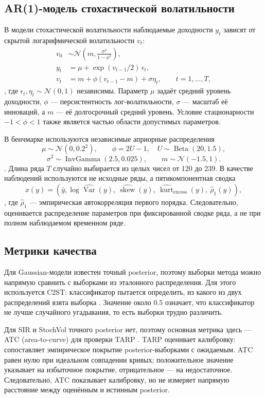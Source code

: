 \subsection{AR(1)-модель стохастической волатильности}

В модели стохастической волатильности наблюдаемые доходности $y_t$
зависят от скрытой логарифмической волатильности $v_t$:
\[
\begin{aligned}
v_0 &\sim \mathcal{N}\left(m,\frac{\sigma^2}{1-\phi^2}\right),\\
y_t &= \mu+\exp(v_{t-1}/2)\,\epsilon_t,\\
v_t &= m+\phi(v_{t-1}-m)+\sigma\eta_t,\qquad t=1,\ldots,T,
\end{aligned}
\],
где $\epsilon_t,\eta_t\sim\mathcal{N}(0,1)$ независимы. Параметр
$\mu$ задаёт средний уровень доходности, $\phi$ --- персистентность
лог-волатильности, $\sigma$ --- масштаб её инноваций, а $m$ --- её
долгосрочный средний уровень. Условие стационарности
$-1<\phi<1$ также является частью области допустимых параметров.

В бенчмарке используются независимые априорные распределения
\[
\mu\sim\mathcal{N}(0,0.2^2),\qquad
\phi=2U-1,\quad U\sim\operatorname{Beta}(20,1.5),
\]
\[
\sigma^2\sim\operatorname{InvGamma}(2.5,0.025),\qquad
m\sim\mathcal{N}(-1.5,1).
\].
Длина ряда $T$ случайно выбирается из целых чисел от 120 до 239. В
качестве наблюдений используются не исходные ряды, а пятикомпонентная
сводка
\[
x(y)=\left(
\bar y,
\log\widehat{\operatorname{Var}}(y),\
\widehat{\operatorname{skew}}(y),\
\widehat{\operatorname{kurt}}_{\mathrm{excess}}(y),\
\widehat{\rho}_1(y)
\right),
\],
где $\widehat{\rho}_1$ --- эмпирическая автокорреляция первого порядка.
Следовательно, оценивается распределение параметров при фиксированной
сводке ряда, а не при полном наблюдаемом временном ряде.

\subsection{Метрики качества}

Для Gaussian-модели известен точный posterior, поэтому выборки метода
можно напрямую сравнить с выборками из эталонного распределения. Для этого
используется C2ST: классификатор пытается определить, из какого из двух
распределений взята выборка \cite{lopezpaz2017c2st}. Значение около $0.5$ означает, что
классификатор не лучше случайного угадывания, то есть выборки трудно
различить.

Для SIR и StochVol точного posterior нет, поэтому основная метрика здесь —
ATC (area-to-curve) для проверки TARP \cite{lueckmann2021benchmarking}.
TARP оценивает калибровку:
сопоставляет эмпирическое покрытие posterior-выборками с ожидаемым.
ATC равен нулю при идеальном совпадении кривых; положительное значение
указывает на избыточное покрытие, отрицательное — на недостаточное.
Следовательно, ATC показывает калибровку, но не измеряет напрямую
расстояние между оценённым и истинным posterior.

